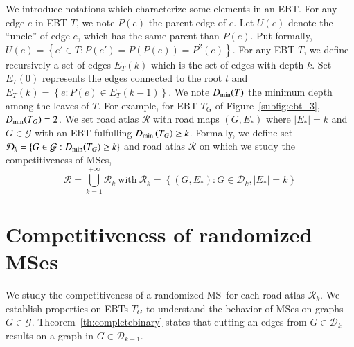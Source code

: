 \documentclass[preprint]{elsarticle}
\newcommand{\set}[1]{\left\{ #1 \right\}}
\newcommand{\card}[1]{\left| #1 \right|}
\newcommand{\mcalg}{\mathcal{G}}
\newcommand{\mcalr}{\mathcal{R}}
\newcommand{\mcald}{\mathcal{D}}
\newcommand{\mts}{MS}
\newcommand{\dmin}{D_{\mbox{\scriptsize{min}}}}
\begin{document}
We introduce notations which characterize some elements in an EBT. For any edge $e$ in EBT $T$, we note $P(e)$ the parent edge of $e$. Let $U(e)$ denote the ``uncle'' of edge $e$, which has the same parent than $P(e)$. Put formally, $U(e) = \set{e' \in T : P(e') = P\left(P(e)\right) = P^2(e)}$. For any EBT $T$, we define recursively a set of edges $E_T(k)$ which is the set of edges with depth $k$. Set $E_T(0)$ represents the edges connected to the root $t$ and $E_T(k) = \set{e : P(e) \in E_T(k-1)}$. We note $\dmin(T)$ the minimum depth among the leaves of $T$. For example, for EBT $T_G$ of Figure~\ref{subfig:ebt_3}, $\dmin(T_G) = 2$. We set road atlas $\mcalr$ with road maps $\left(G,E_*\right)$ where $\card{E_*} = k$ and $G \in \mcalg$ with an EBT fulfulling $\dmin\left(T_G\right) \geq k$. Formally, we define set $\mcald_k = \set{G \in \mcalg : \dmin(T_G) \geq k}$ and road atlas $\mcalr$ on which we study the competitiveness of \mts es,
\[
\mcalr = \bigcup\limits_{k=1}^{+\infty} \mcalr_k ~\mbox{with}~
\mcalr_k = \set{\left(G ,E_*\right): G \in \mcald_k, \card{E_*} = k}
\]

\section{Competitiveness of randomized \mts es} \label{sec:competitiveness}

We study the competitiveness of a randomized \mts ~for each road atlas $\mcalr_k$. We establish properties on EBTs $T_G$ to understand the behavior of \mts es on graphs $G \in \mcalg$. Theorem~\ref{th:completebinary} states that cutting an edges from $G \in \mcald_k$ results on a graph in $G \in \mcald_{k-1}$.
\end{document}
